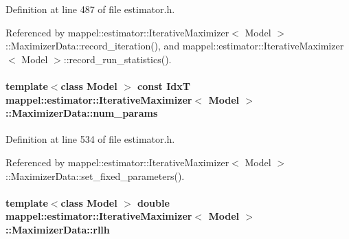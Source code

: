 Definition at line 487 of file estimator.\+h.



Referenced by mappel\+::estimator\+::\+Iterative\+Maximizer$<$ Model $>$\+::\+Maximizer\+Data\+::record\+\_\+iteration(), and mappel\+::estimator\+::\+Iterative\+Maximizer$<$ Model $>$\+::record\+\_\+run\+\_\+statistics().

\paragraph[{\texorpdfstring{num\+\_\+params}{num_params}}]{\setlength{\rightskip}{0pt plus 5cm}template$<$class Model $>$ const {\bf IdxT} {\bf mappel\+::estimator\+::\+Iterative\+Maximizer}$<$ Model $>$\+::Maximizer\+Data\+::num\+\_\+params\hspace{0.3cm}{\ttfamily [protected]}}\hypertarget{classmappel_1_1estimator_1_1IterativeMaximizer_1_1MaximizerData_ab4a5825d98602d9f94f3666c2167619d}{}\label{classmappel_1_1estimator_1_1IterativeMaximizer_1_1MaximizerData_ab4a5825d98602d9f94f3666c2167619d}


Definition at line 534 of file estimator.\+h.



Referenced by mappel\+::estimator\+::\+Iterative\+Maximizer$<$ Model $>$\+::\+Maximizer\+Data\+::set\+\_\+fixed\+\_\+parameters().

\paragraph[{\texorpdfstring{rllh}{rllh}}]{\setlength{\rightskip}{0pt plus 5cm}template$<$class Model $>$ double {\bf mappel\+::estimator\+::\+Iterative\+Maximizer}$<$ Model $>$\+::Maximizer\+Data\+::rllh}\hypertarget{classmappel_1_1estimator_1_1IterativeMaximizer_1_1MaximizerData_a8df6de6efff1eab16147e3ab42f98469}{}\label{classmappel_1_1estimator_1_1IterativeMaximizer_1_1MaximizerData_a8df6de6efff1eab16147e3ab42f98469}


